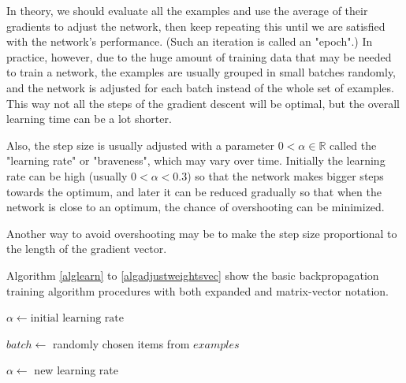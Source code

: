 \documentclass[titlepage]{article}
\begin{document}
      In theory, we should evaluate all the examples and use the average of
      their gradients to adjust the network, then keep repeating this until we
      are satisfied with the network's performance. (Such an iteration is
      called an "epoch".) In practice, however, due to the huge amount of
      training data that may be needed to train a network, the examples are
      usually grouped in small batches randomly, and the network is adjusted
      for each batch instead of the whole set of examples. This way not all the
      steps of the gradient descent will be optimal, but the overall learning
      time can be a lot shorter.

      Also, the step size is usually adjusted with a parameter
      $0 < \alpha \in \mathbb{R}$ called the "learning rate" or "braveness",
      which may vary over time. Initially the learning rate can be high (usually
      $0 < \alpha < 0.3$) so that the network makes bigger steps towards the
      optimum, and later it can be reduced gradually so that when the network
      is close to an optimum, the chance of overshooting can be minimized.

      Another way to avoid overshooting may be to make the step size
      proportional to the length of the gradient vector.

      Algorithm \ref{alglearn} to \ref{algadjustweightsvec} show the basic
      backpropagation training algorithm procedures with both expanded and
      matrix-vector notation.

      \begin{algorithm}
        \caption{%
          Train the network with the given set of examples. An example is an
          $(\mathbf{x}, \mathbf{y})$ pair where
          $\mathbf{x} \in \mathbb{R}^{n_0}$ is an example input, and
          $\mathbf{y} \in \mathbb{R}^{n_L}$ is the desired output for
          $\mathbf{x}$.
        } \label{alglearn}
        \begin{algorithmic}
            \State $\alpha \gets \text{initial learning rate}$
            \State {}

            \Repeat
              \State $batch \gets$ randomly chosen items from $examples$
              \State {}

                \State {}
                \State {}
              \EndFor

              \State {}

              \State $\alpha \gets$ new learning rate
          \EndProcedure
        \end{algorithmic}
      \end{algorithm}
\end{document}
